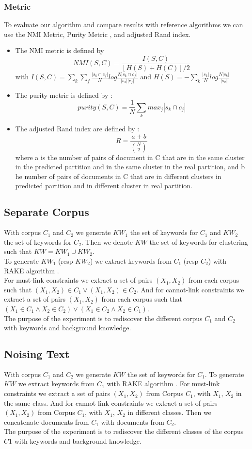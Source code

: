 \subsubsection{Metric}
To evaluate our algorithm and compare results with reference algorithms we can
use the NMI Metric, Purity Metric \cite{measure}, and adjusted
Rand index. 
\begin{itemize}
\item The NMI metric is defined by
$$
NMI(S,C) = \frac{I(S,C)}{[H(S)+H(C)]/2}
$$ 
with
$
I(S,C) =\sum_k \sum_f\frac{|s_k \cap c_f|}{N}log\frac{N|s_k \cap c_f|}{|s_k| |c_f|}
$ and $
H(S) = -\sum_k\frac{|s_k|}{N}log\frac{N|s_k|}{|s_k|}
$
\item The purity metric is defined by :
$$
purity(S,C) = \frac{1}{N}\sum_k {max}_j|s_k \cap c_j|
$$
\item The adjusted Rand index are defined by :
  $$R = \frac{a+b}{\binom{N}{2}}$$
  where a is the number of pairs of document in C
  that are in the same cluster in the predicted partition and in the
  same cluster in the real partition, and b he number of pairs of
  documents in C that are in different clusters in predicted partition
  and in different cluster in real partition.
\end{itemize}
\subsection{Separate Corpus }
With corpus $C_1$ and $C_2$ we generate $KW_1$ the set of keywords
for $C_1$ and $KW_2$ the set of keywords for $C_2$. Then we denote $KW$
the set of keywords for clustering such that $KW = KW_1 \cup KW_2$.\\
To generate $KW_1$ (resp $KW_2$) we extract keywords from $C_1$ (resp $C_2$)
with RAKE algorithm \cite{rake}.\\
For must-link constraints we extract a set of pairs $(X_1, X_2)$ from each
corpus such that $(X_1, X_2) \in C_1 \vee (X_1, X_2) \in C_2$.
And for cannot-link constraints we extract a set of pairs $(X_1, X_2)$ from
each corpus such that $(X_1 \in C_1 \wedge  X_2 \in C_2)\vee (X_1 \in C_2 \wedge
X_2 \in C_1)$.\\
The purpose of the experiment is to rediscover the different corpus $C_1$ and
$C_2$ with keywords and background knowledge.
\subsection{Noising Text}
With corpus $C_1$ and $C_2$ we generate $KW$ the set of keywords
for $C_1$.
To generate $KW$ we extract keywords from $C_1$ with RAKE algorithm \cite{rake}.
For must-link constraints we extract a set of pairs $(X_1, X_2)$ from Corpus
$C_1$, with $X_1$, $X_2$ in the same class.
And for cannot-link constraints we extract a set of pairs $(X_1, X_2)$ from Corpus
$C_1$, with $X_1$, $X_2$ in different classes.
Then we concatenate documents from $C_1$ with documents from $C_2$.\\
The purpose of the experiment is to rediscover the different classes of the
corpus $C1$ with keywords and background knowledge.
